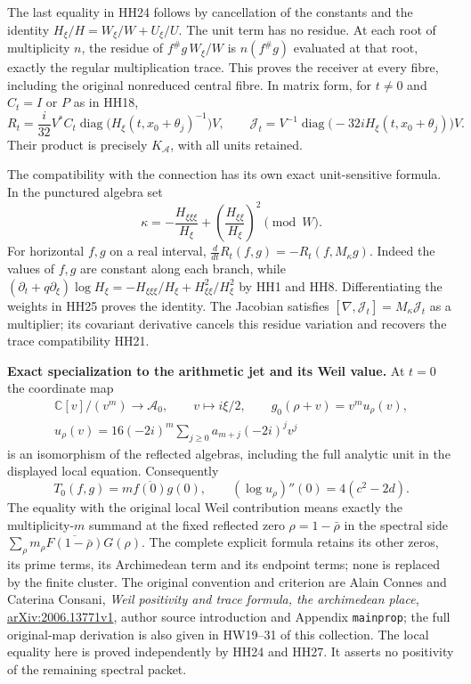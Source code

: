 The last equality in HH24 follows by cancellation of the constants
and the identity
$H_\xi/H=W_\xi/W+U_\xi/U$. The unit term has no residue.
At each root of multiplicity $n$, the residue of
$f^\#g\,W_\xi/W$ is $n(f^\#g)$ evaluated at that root, exactly the
regular multiplication trace. This proves the receiver at every
fibre, including the original nonreduced central fibre.
In matrix form, for $t\ne0$ and $C_t=I$ or $P$ as in HH18,
\[
 R_t=\frac{i}{32}V^*C_t
       \operatorname{diag}\bigl(H_\xi(t,x_0+\theta_j)^{-1}\bigr)V,
 \qquad
 \mathcal J_t=V^{-1}
       \operatorname{diag}\bigl(-32iH_\xi(t,x_0+\theta_j)\bigr)V .
 \tag{HH25}\label{hh:residue-matrix}
\]
Their product is precisely $K_{\mathcal A}$, with all units retained.

The compatibility with the connection has its own exact unit-sensitive
formula. In the punctured algebra set
\[
 \kappa=-\frac{H_{\xi\xi\xi}}{H_\xi}
                +\left(\frac{H_{\xi\xi}}{H_\xi}\right)^2\pmod W.
 \tag{HH26}
\]
For horizontal $f,g$ on a real interval,
$\frac{d}{dt}R_t(f,g)=-R_t(f,M_\kappa g)$.
Indeed the values of $f,g$ are constant along each branch, while
$(\partial_t+q\partial_\xi)\log H_\xi
=-H_{\xi\xi\xi}/H_\xi+H_{\xi\xi}^2/H_\xi^2$ by HH1 and HH8.
Differentiating the weights in HH25 proves the identity. The
Jacobian satisfies $[\nabla,\mathcal J_t]=M_\kappa\mathcal J_t$ as
a multiplier; its covariant derivative cancels this residue variation and
recovers the trace compatibility HH21.

\HH\textbf{Exact specialization to the arithmetic jet and its Weil value.}
At $t=0$ the coordinate map
\[
 \begin{gathered}
 \mathbb C[v]/(v^m)\longrightarrow\mathcal A_0,\qquad
 v\longmapsto i\xi/2,\qquad g_0(\rho+v)=v^m u_\rho(v),\\
 u_\rho(v)=16(-2i)^m\sum_{j\ge0}a_{m+j}(-2i)^jv^j
 \end{gathered}
 \tag{HH27}\label{hh:arithmetic-unit}
\]
is an isomorphism of the reflected algebras, including the full
analytic unit in the displayed local equation.
Consequently
\[
 T_0(f,g)=m\overline{f(0)}g(0),\qquad
 (\log u_\rho)''(0)=4(c^2-2d).
 \tag{HH28}
\]
The equality with the original local Weil contribution means exactly
the multiplicity-$m$ summand at the fixed reflected zero
$\rho=1-\bar\rho$ in the spectral side
$\sum_\rho m_\rho\overline{F(1-\bar\rho)}G(\rho)$.
The complete explicit formula retains its other zeros, its prime
terms, its Archimedean term and its endpoint terms; none is replaced
by the finite cluster. The original convention and criterion are
Alain Connes and Caterina Consani,
\emph{Weil positivity and trace formula, the archimedean place},
\href{https://arxiv.org/abs/2006.13771v1}{arXiv:2006.13771v1},
author source introduction and Appendix \texttt{mainprop};
the full original-map derivation is also given in HW19--31 of this
collection. The local equality here is proved independently by HH24
and HH27. It asserts no positivity of the remaining spectral packet.

